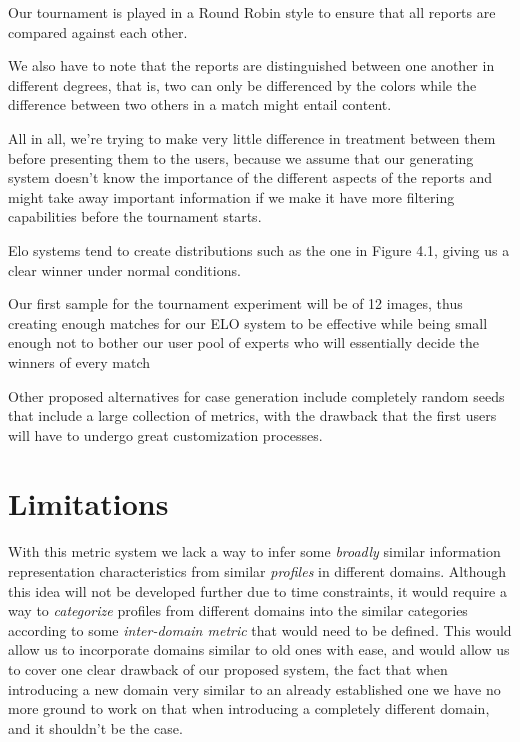 Our tournament is played in a Round Robin style to ensure that all reports are compared against each other.

We also have to note that the reports are distinguished between one another in different degrees, that is, two can only be differenced by the colors while the difference between two others in a match might entail content.

All in all, we're trying to make very little difference in treatment between them before presenting them to the users, because we assume that our generating system doesn't know the importance of the different aspects of the reports and might take away important information if we make it have more filtering capabilities before the tournament starts.


Elo systems tend to create distributions such as the one in Figure 4.1, giving us a clear winner under normal conditions.

Our first sample for the tournament experiment will be of 12 images, thus creating enough matches for our ELO system to be effective while being small enough not to bother our user pool of experts who will essentially decide the winners of every match

Other proposed alternatives for case generation include completely random seeds that include a large collection of metrics, with the drawback that the first users will have to undergo great customization processes.

\section{Limitations}
\label{cap4:sec:limitations}
With this metric system we lack a way to infer some \textit{broadly} similar information representation characteristics from similar \textit{profiles} in different domains.
Although this idea will not be developed further due to time constraints, it would require a way to \textit{categorize} profiles from different domains into the similar categories according to some \textit{inter-domain metric} that would need to be defined.
This would allow us to incorporate domains similar to old ones with ease, and would allow us to cover one clear drawback of our proposed system, the fact that when introducing a new domain very similar to an already established one we have no more ground to work on that when introducing a completely different domain, and it shouldn't be the case.

